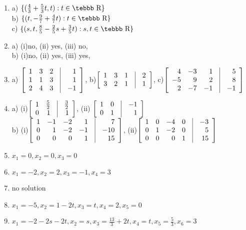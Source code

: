 \begin{enumerate}
\item
a) $\{(\frac{4}{3}+\frac{5}{3}t,t): t \in {\mbox{\tebbb R}}\}$\\
b) $\{(t,-\frac{9}{7}+\frac{4}{7}t): t \in {\mbox{\tebbb R}}\}$\\
c)  $\{(s, t,\frac{8}{5}-\frac{2}{5}s+\frac{3}{5}t): s,t \in {\mbox{\tebbb R}}\}$
\item
a) (i)no, (ii) yes, (iii) no,\\
b) (i)no, (ii) yes, (iii) yes,\\

\item a) $\left [\begin {array}{rrrrr} 1&3&2&\vline&1 \\ 1&1&3&\vline&1\\ 2&4&3&
\vline&-1  \end {array}\right ]$, b)$\left [\begin {array}{rrrrr} 1&3&1&\vline&2 \\3&2&1&
\vline&1\end {array}\right ]$, c)$\left [\begin {array}{rrrrr} 4&-3&1&\vline&5 \\-5&9&2&
\vline&8 \\ 2&-7&-1&\vline&-1\end {array}\right ]$
\item a) (i)$\left [\begin {array}{rrrr} 1&\frac{5}{2}&\vline&\frac{3}{2}\\0&1&\vline&1
\end {array}\right ]$, \quad (ii) $\left [\begin {array}{rrrr} 1&0&\vline&-1\\0&1&\vline&1\end {array}
\right ]$\\

b) (i)$\left [\begin {array}{rrrrrr} 1&-1&-2&1&\vline&7\\0&1&-2&-1&
\vline&-10\\0&0&0&1&\vline&15\end {array}\right ]$, \quad
(ii)$\left [\begin {array}{rrrrrr} 1&0&-4&0&\vline&-3\\0&1&-2&0&\vline&5
\\0&0&0&1&\vline&15\end {array}\right ]$

\item $x_1=0, x_2=0, x_3=0$
\item $x_1=-2,x_2=2,x_3=-1,x_4=3$
\item  no solution
\item $x_1=-5,x_2=1-2t,x_3=t,x_4=2,x_5=0$
\item
$x_1=-2-2s-2t,x_2=s,x_3=\frac{13}{3}+2t,x_4=t,x_5=\frac{5}{3},
x_6=3$

\end{enumerate}
\fi

%
